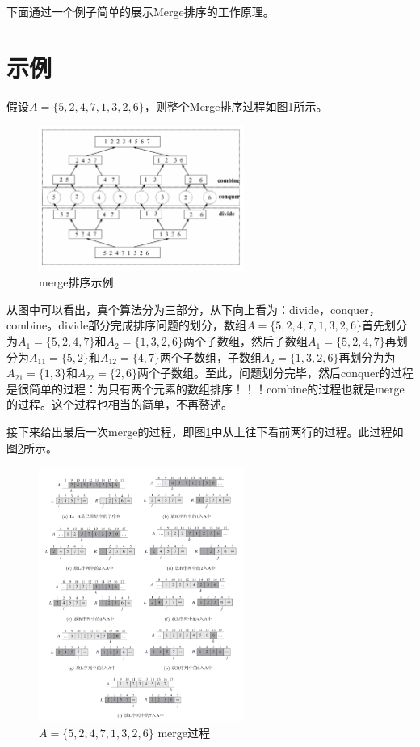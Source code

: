 \documentclass[10pt,a4paper,UTF8]{article}
\begin{document}
下面通过一个例子简单的展示Merge排序的工作原理。
\section{示例}
\label{sec:org5bac6dd}



假设\(A=\{ 5,2,4,7,1,3,2,6\}\)，则整个Merge排序过程如图\ref{fig:orgb56fa33}所示。

\begin{figure}[htbp]
\centering
\includegraphics[width=0.6\textwidth]{../../img/computer_algorithms/20170703mergeSort.png}
\caption{\label{fig:orgb56fa33}
merge排序示例}
\end{figure}


从图中可以看出，真个算法分为三部分，从下向上看为：divide，conquer，combine。divide部分完成排序问题的划分，数组\(A=\{ 5,2,4,7,1,3,2,6\}\)首先划分为\(A_1=\{ 5,2,4,7\}\)和\(A_2=\{1,3,2,6\}\)两个子数组，然后子数组\(A_1=\{ 5,2,4,7\}\)再划分为\(A_{11}=\{ 5,2\}\)和\(A_{12}=\{4,7\}\)两个子数组，子数组\(A_2=\{1,3,2,6\}\)再划分为为\(A_{21}=\{1,3\}\)和\(A_{22}=\{2,6\}\)两个子数组。至此，问题划分完毕，然后conquer的过程是很简单的过程：为只有两个元素的数组排序！！！combine的过程也就是merge的过程。这个过程也相当的简单，不再赘述。

接下来给出最后一次merge的过程，即图\ref{fig:orgb56fa33}中从上往下看前两行的过程。此过程如图\ref{fig:org8472bfc}所示。

\begin{figure}[htbp]
\centering
\includegraphics[width=0.6\textwidth]{../../img/computer_algorithms/20170703mergeSortExample.png}
\caption{\label{fig:org8472bfc}
\(A=\{ 5,2,4,7,1,3,2,6\}\) merge过程}
\end{figure}
\end{document}
